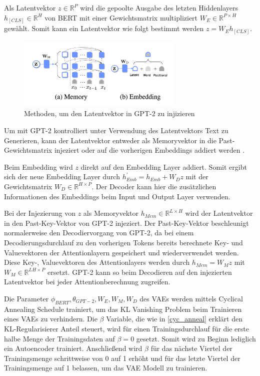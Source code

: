 \pagebreak
Als Latentvektor $z \in \mathbb{R}^P$ wird die gepoolte Ausgabe des letzten Hiddenlayers $h_{[CLS]} \in \mathbb{R}^H$ von BERT mit einer Gewichtsmatrix multipliziert $W_{E} \in \mathbb{R}^{P\times H}$ gewählt. Somit kann ein Latentvektor wie folgt bestimmt werden $z = W_{E}h_{[CLS]}$.

\begin{figure}[h]
    \centering
    \includegraphics[width=8cm]{bilder/latent_optimus}
    \caption{Methoden, um den Latentvektor in GPT-2 zu injizieren \citep{DBLP:journals/corr/abs-2004-04092}}
    \label{latent_optimus}
\end{figure}

Um mit GPT-2 kontrolliert unter Verwendung des Latentvektors Text zu Generieren, kann der Latentvektor entweder als Memoryvektor in die Past-Gewichtsmatrix injeziert oder auf die vorherigen Embeddings addiert werden \citep{DBLP:journals/corr/abs-2004-04092}.

Beim Embedding wird $z$ direkt auf den Embedding Layer addiert. Somit ergibt sich der neue Embedding Layer durch $h_{Emb}^{'} = h_{Emb} + W_D z$ mit der Gewichtsmatrix $W_D \in \mathbb{R}^{H \times P}$.
Der Decoder kann hier die zusätzlichen Informationen des Embeddings beim Input und Output Layer verwenden.

Bei der Injezierung von $z$ als Memoryvektor $h_{Mem} \in \mathbb{R}^{L\times H}$ wird der Latentvektor in den Past-Key-Vektor von GPT-2 injeziert. 
Der Past-Key-Vektor beschleunigt normalerweise den Decodiervorgang von GPT-2, da bei einem Decodierungsdurchlauf zu den vorherigen Tokens bereits berechnete Key- und Valuevektoren der Attentionlayern gespeichert und wiederverwendet werden.
Diese Key-, Valuevektoren des Attentionlayers werden durch $h_{Mem} = W_M z$ mit $W_M \in \mathbb{R}^{LH \times P}$ ersetzt. GPT-2 kann so beim Decodieren auf den injezierten Latentvektor bei jeder Attentionberechnung zugreifen.

Die Parameter ${\phi_{BERT}, \theta_{GPT-2}, W_E,W_M,W_D}$ des VAEs werden mittels Cyclical Annealing Schedule \citep{cyc_anneal} trainiert, um das KL Vanishing Problem beim Trainieren eines VAEs zu verhindern.
Die $\beta$ Variable, die wie in \ref{cyc_anneal} erklärt den KL-Regularisierer Anteil steuert, wird für einen Trainingsdurchlauf für die erste halbe Menge der Trainingsdaten auf $\beta = 0$ gesetzt. Somit wird zu Beginn lediglich ein Autoencoder trainiert. 
Anschließend wird $\beta$ für das nächste Viertel der Trainingsmenge schrittweise von 0 auf 1 erhöht und für das letzte Viertel der Trainingsmenge auf 1 belassen, um das VAE Modell zu trainieren.

